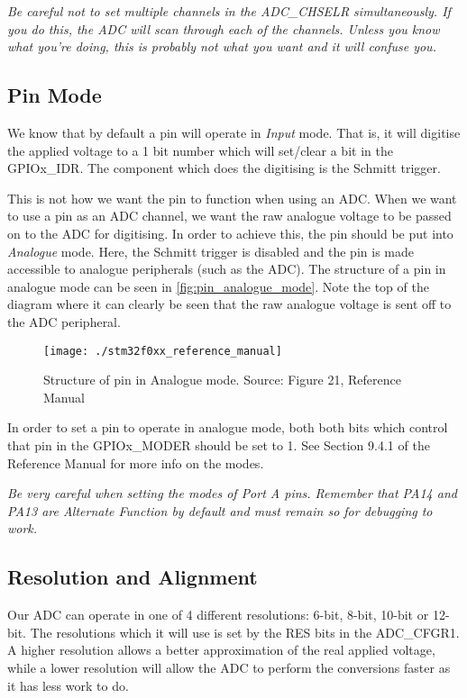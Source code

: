 \emph{Be careful not to set multiple channels in the ADC\_CHSELR simultaneously. If you do this, the ADC will scan through each of the channels. Unless you know what you're doing, this is probably not what you want and it will confuse you.}

\subsection{Pin Mode}
We know that by default a pin will operate in \emph{Input} mode. That is, it will digitise the applied voltage to a 1 bit number which will set/clear a bit in the GPIOx\_IDR. The component which does the digitising is the Schmitt trigger. 

This is not how we want the pin to function when using an ADC. When we want to use a pin as an ADC channel, we want the raw analogue voltage to be passed on to the ADC for digitising. In order to achieve this, the pin should be put into \emph{Analogue} mode. Here, the Schmitt trigger is disabled and the pin is made accessible to analogue peripherals (such as the ADC). The structure of a pin in analogue mode can be seen in \autoref{fig:pin_analogue_mode}. Note the top of the diagram where it can clearly be seen that the raw analogue voltage is sent off to the ADC peripheral.

\begin{figure}
\centering
\texttt{[image: ./stm32f0xx\_reference\_manual]}
\caption{Structure of pin in Analogue mode. Source: Figure 21, Reference Manual}
\label{fig:pin_analogue_mode}
\end{figure}

In order to set a pin to operate in analogue mode, both both bits which control that pin in the GPIOx\_MODER should be set to 1. See Section 9.4.1 of the Reference Manual for more info on the modes. 

\emph{Be very careful when setting the modes of Port A pins. Remember that PA14 and PA13 are Alternate Function by default and must remain so for debugging to work.}


\subsection{Resolution and Alignment}
Our ADC can operate in one of 4 different resolutions: 6-bit, 8-bit, 10-bit or 12-bit. The resolutions which it will use is set by the RES bits in the ADC\_CFGR1. A higher resolution allows a better approximation of the real applied voltage, while a lower resolution will allow the ADC to perform the conversions faster as it has less work to do.

